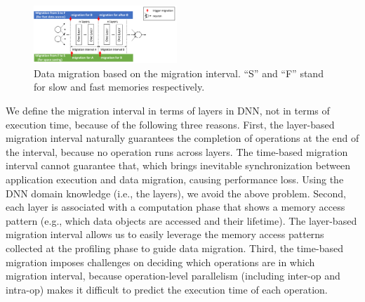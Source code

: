 \begin{figure}
\centering
\includegraphics[width=0.48\textwidth]{figures/migration_interval.pdf}
\vspace{-20pt}
\caption{
\textcolor{check}{
Data migration based on the migration interval.  
\textcolor{check}{``S'' and ``F'' stand for slow and fast memories respectively.}}
}
	\centering
	\vspace{-15pt}
	\label{fig:migration_interval} 
\end{figure}

We define the migration interval in terms of layers in DNN, not in terms of execution time, because of the following three reasons. First, the layer-based migration interval naturally guarantees the completion of operations at the end of the interval, because no operation runs across layers. 
The time-based migration interval cannot guarantee that, which brings inevitable synchronization between application execution and data migration, causing performance loss. Using the DNN domain knowledge (i.e., the layers), we avoid the above problem. Second, each layer is associated with a computation phase that shows a memory access pattern \textcolor{check}{(e.g., which data objects are  accessed and their lifetime)}. 
The layer-based migration interval allows us to easily leverage the memory access patterns collected at the profiling phase to guide data migration. Third, the time-based migration imposes challenges on deciding which operations are in which migration interval, because  \textcolor{check}{operation-level parallelism  (including inter-op and intra-op)} \textcolor{check}{makes it difficult to predict the execution time of each operation}.


